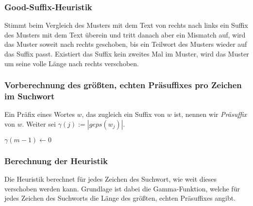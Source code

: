 \subsubsection{Good-Suffix-Heuristik}
Stimmt beim Vergleich des Musters mit dem Text von rechts nach links ein Suffix des Musters mit dem Text überein und tritt danach aber ein Mismatch auf, wird das Muster soweit nach rechts geschoben, bis ein Teilwort des Musters wieder auf das Suffix passt. Existiert das Suffix kein zweites Mal im Muster, wird das Muster um seine volle Länge nach rechts verschoben.

\subsubsection{Vorberechnung des größten, echten Präsuffixes pro Zeichen im Suchwort}
Ein Präfix eines Wortes \(w\), das zugleich ein Suffix von \(w\) ist, nennen wir \textit{Präsuffix} von \(w\). Weiter sei \(\gamma(j) := | geps(w_j)|\).

\begin{algorithm}[H]
	\caption{$\gamma$}

	\BlankLine

	$\gamma(m-1) \longleftarrow 0$\newline
	\BlankLine

\end{algorithm}

\subsubsection{Berechnung der Heuristik}
Die Heuristik berechnet für jedes Zeichen des Suchwort, wie weit dieses verschoben werden kann. Grundlage ist dabei die Gamma-Funktion, welche für jedes Zeichen des Suchworts die Länge des größten, echten Präsuffixes angibt.

\begin{algorithm}[H]
	\caption{$\gamma$}

	\BlankLine

	\BlankLine

\end{algorithm}

